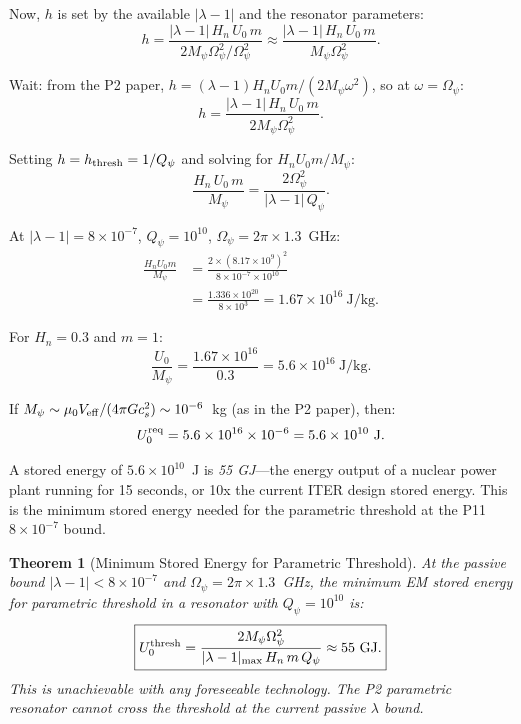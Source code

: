 \documentclass[11pt,twocolumn]{article}
\newcommand{\lam}{\lambda}
\newcommand{\Opsi}{\Omega_\psi}
\newcommand{\Mpsi}{M_\psi}
\newtheorem{theorem}{Theorem}
\begin{document}
Now, $h$ is set by the available $|\lam-1|$ and the resonator parameters:
\begin{equation}
h = \frac{|\lam-1|\,H_n\,U_0\,m}{2\Mpsi\Opsi^2/\Opsi^2}
\approx \frac{|\lam-1|\,H_n\,U_0\,m}{\Mpsi\Opsi^2}.
\end{equation}

Wait: from the P2 paper, $h = (\lam-1)H_n U_0 m / (2\Mpsi\omega^2)$,
so at $\omega = \Opsi$:
\begin{equation}
h = \frac{|\lam-1|\,H_n\,U_0\,m}{2\Mpsi\Opsi^2}.
\label{eq:h_exact}
\end{equation}

Setting $h = h_{\rm thresh} = 1/Q_\psi$ and solving for $H_n U_0 m / \Mpsi$:
\begin{equation}
\frac{H_n\,U_0\,m}{\Mpsi} = \frac{2\Opsi^2}{|\lam-1|\,Q_\psi}.
\label{eq:design_constraint}
\end{equation}

At $|\lam-1| = 8\times10^{-7}$, $Q_\psi = 10^{10}$, $\Opsi = 2\pi\times1.3$~GHz:
\begin{align}
\frac{H_n U_0 m}{\Mpsi} &= \frac{2\times(8.17\times10^9)^2}
{8\times10^{-7}\times10^{10}}
\nonumber\\
&= \frac{1.336\times10^{20}}{8\times10^3}
= 1.67\times10^{16}~\text{J/kg}.
\label{eq:design_num}
\end{align}

For $H_n = 0.3$ and $m = 1$:
\begin{equation}
\frac{U_0}{\Mpsi} = \frac{1.67\times10^{16}}{0.3} = 5.6\times10^{16}~\text{J/kg}.
\label{eq:u0_mpsi}
\end{equation}

If $\Mpsi \sim \mu_0 V_{\rm eff}/(4\pi G c_s^2) \sim 10^{-6}$~kg (as in the P2 paper),
then:
\begin{equation}
U_0^{\rm req} = 5.6\times10^{16}\times10^{-6} = 5.6\times10^{10}~\text{J}.
\label{eq:u0_required}
\end{equation}

A stored energy of $5.6\times10^{10}$~J is \emph{55 GJ}---the energy output of a
nuclear power plant running for 15 seconds, or 10x the current ITER design
stored energy. This is the minimum stored energy needed for the parametric
threshold at the P11 $8\times10^{-7}$ bound.

\begin{theorem}[Minimum Stored Energy for Parametric Threshold]
\label{thm:energy_thresh}
At the passive bound $|\lam-1| < 8\times10^{-7}$ and $\Opsi = 2\pi\times1.3$~GHz,
the minimum EM stored energy for parametric threshold in a resonator with
$Q_\psi = 10^{10}$ is:
\begin{equation}
\boxed{
U_0^{\rm thresh} = \frac{2\Mpsi\Opsi^2}{|\lam-1|_{\max}\,H_n\,m\,Q_\psi}
\approx 55~\text{GJ}.
}
\label{eq:u0_thresh_final}
\end{equation}
This is unachievable with any foreseeable technology. The P2 parametric
resonator cannot cross the threshold at the current passive $\lam$ bound.
\end{theorem}
\end{document}
